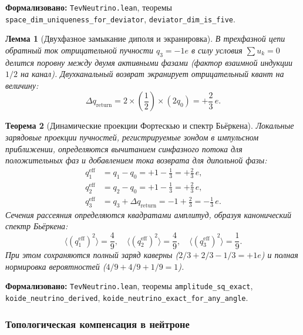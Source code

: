 \documentclass[11pt,a4paper]{article}
\newtheorem{theorem}{Теорема}
\newtheorem{lemma}[theorem]{Лемма}
\theoremstyle{definition}
\theoremstyle{remark}
\begin{document}
\noindent\small\textbf{Формализовано:} \texttt{TevNeutrino.lean}, теоремы \texttt{space_dim_uniqueness_for_deviator}, \texttt{deviator_dim_is_five}.

\begin{lemma}[Двухфазное замыкание диполя и экранировка]
\label{lem:dipole_return_shielding}
В трехфазной цепи обратный ток отрицательной пучности $q_3 = -1e$ в силу условия $\sum u_k = 0$ делится поровну между двумя активными фазами (фактор взаимной индукции $1/2$ на канал). Двухканальный возврат экранирует отрицательный квант на величину:
\begin{equation}
\Delta q_{\mathrm{return}} = 2 \times \left(\frac{1}{2}\right) \times (2 q_0) = +\frac{2}{3} \, e.
\label{eq:dipole_return_formula}
\end{equation}
\end{lemma}

\begin{theorem}[Динамические проекции Фортескью и спектр Бьёркена]
\label{thm:fortescue_charges}
Локальные зарядовые проекции пучностей, регистрируемые зондом в импульсном приближении, определяются вычитанием синфазного потока для положительных фаз и добавлением тока возврата для дипольной фазы:
\begin{align}
q_1^{\mathrm{eff}} &= q_1 - q_0 = +1 - \frac{1}{3} = +\frac{2}{3} \, e, \label{eq:q_eff_1} \\
q_2^{\mathrm{eff}} &= q_2 - q_0 = +1 - \frac{1}{3} = +\frac{2}{3} \, e, \label{eq:q_eff_2} \\
q_3^{\mathrm{eff}} &= q_3 + \Delta q_{\mathrm{return}} = -1 + \frac{2}{3} = -\frac{1}{3} \, e. \label{eq:q_eff_3}
\end{align}
Сечения рассеяния определяются квадратами амплитуд, образуя канонический спектр Бьёркена:
\begin{equation}
\langle (q_1^{\mathrm{eff}})^2 \rangle = \frac{4}{9}, \quad
\langle (q_2^{\mathrm{eff}})^2 \rangle = \frac{4}{9}, \quad
\langle (q_3^{\mathrm{eff}})^2 \rangle = \frac{1}{9}.
\label{eq:bjorken_weights_squares}
\end{equation}
При этом сохраняются полный заряд каверны ($2/3 + 2/3 - 1/3 = +1e$) и полная нормировка вероятностей ($4/9 + 4/9 + 1/9 = 1$).
\end{theorem}

\noindent\small\textbf{Формализовано:} \texttt{TevNeutrino.lean}, теоремы \texttt{amplitude_sq_exact}, \texttt{koide_neutrino_derived}, \texttt{koide_neutrino_exact_for_any_angle}.

\subsubsection{Топологическая компенсация в нейтроне}
\end{document}
